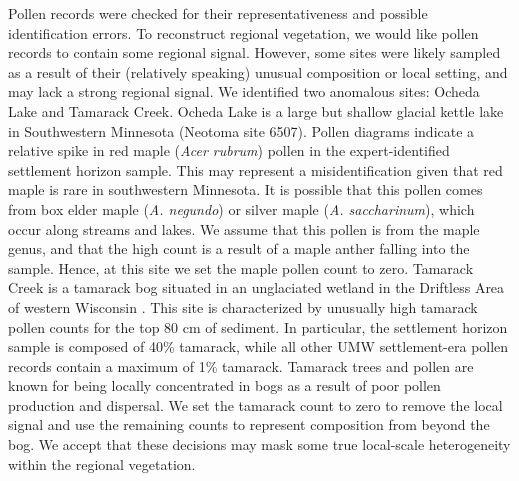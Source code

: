 \documentclass[12pt]{article}
\begin{document}
Pollen records were checked for their representativeness and possible
identification errors. To reconstruct regional vegetation, we would
like pollen records to contain some regional signal. However, some
sites were likely sampled as a result of their (relatively speaking)
unusual composition or local setting, and may lack a strong regional
signal. We identified two anomalous sites: Ocheda Lake and Tamarack
Creek. Ocheda Lake is a large but shallow glacial kettle lake in
Southwestern Minnesota (Neotoma site 6507). Pollen diagrams indicate a
relative spike in red maple (\textit{Acer rubrum}) pollen in the
expert-identified settlement horizon sample. This may represent a
misidentification given that red maple is rare in southwestern
Minnesota. It is possible that this pollen comes from box elder maple
(\textit{A. negundo}) or silver maple (\textit{A. saccharinum}), which
occur along streams and lakes. We assume that this pollen is from the
maple genus, and that the high count is a result of a maple anther
falling into the sample. Hence, at this site we set the maple pollen
count to zero. Tamarack Creek is a tamarack bog situated in an
unglaciated wetland in the Driftless Area of western Wisconsin
\citep{davis1979wetland}. This site is characterized by unusually high
tamarack pollen counts for the top 80 cm of sediment. In particular,
the settlement horizon sample is composed of 40\% tamarack, while all
other UMW settlement-era pollen records contain a maximum of 1\%
tamarack. Tamarack trees and pollen are known for being locally
concentrated in bogs as a result of poor pollen production and
dispersal. We set the tamarack count to zero to remove the local
signal and use the remaining counts to represent composition from
beyond the bog. We accept that these decisions may mask some true
local-scale heterogeneity within the regional vegetation.
\end{document}
